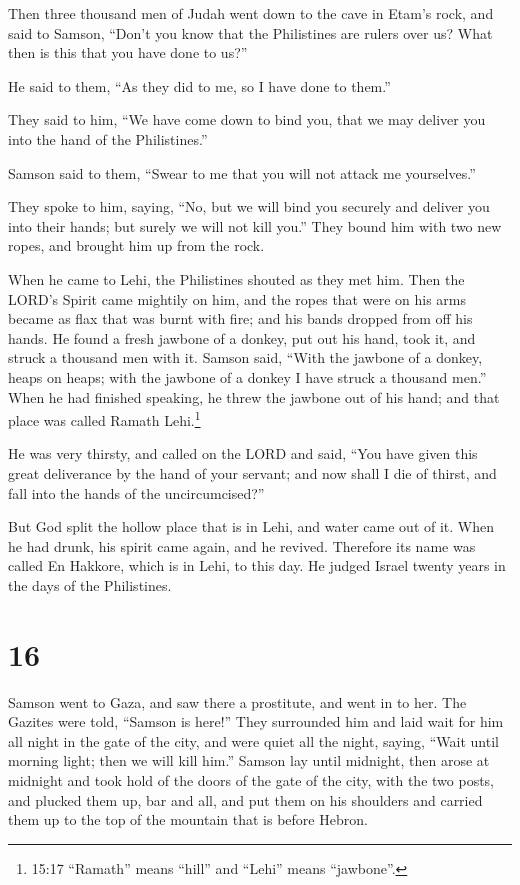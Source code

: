  Then three thousand men of Judah went down to the cave in
Etam's rock, and said to Samson, ``Don't you know that the Philistines
are rulers over us? What then is this that you have done to us?''

He said to them, ``As they did to me, so I have done to them.''

 They said to him, ``We have come down to bind you, that we
may deliver you into the hand of the Philistines.''

Samson said to them, ``Swear to me that you will not attack me
yourselves.''

 They spoke to him, saying, ``No, but we will bind you
securely and deliver you into their hands; but surely we will not kill
you.'' They bound him with two new ropes, and brought him up from the
rock.

 When he came to Lehi, the Philistines shouted as they met
him. Then the LORD's Spirit came mightily on him, and the ropes that
were on his arms became as flax that was burnt with fire; and his bands
dropped from off his hands.  He found a fresh jawbone of a
donkey, put out his hand, took it, and struck a thousand men with it.
 Samson said, ``With the jawbone of a donkey, heaps on
heaps; with the jawbone of a donkey I have struck a thousand men.''
 When he had finished speaking, he threw the jawbone out of
his hand; and that place was called Ramath Lehi.\footnote{15:17
  ``Ramath'' means ``hill'' and ``Lehi'' means ``jawbone''.}

 He was very thirsty, and called on the LORD and said,
``You have given this great deliverance by the hand of your servant; and
now shall I die of thirst, and fall into the hands of the
uncircumcised?''

 But God split the hollow place that is in Lehi, and water
came out of it. When he had drunk, his spirit came again, and he
revived. Therefore its name was called En Hakkore, which is in Lehi, to
this day.  He judged Israel twenty years in the days of the
Philistines.

\hypertarget{section-15}{%
\section{16}\label{section-15}}

 Samson went to Gaza, and saw there a prostitute, and went
in to her.  The Gazites were told, ``Samson is here!'' They
surrounded him and laid wait for him all night in the gate of the city,
and were quiet all the night, saying, ``Wait until morning light; then
we will kill him.''  Samson lay until midnight, then arose
at midnight and took hold of the doors of the gate of the city, with the
two posts, and plucked them up, bar and all, and put them on his
shoulders and carried them up to the top of the mountain that is before
Hebron.

